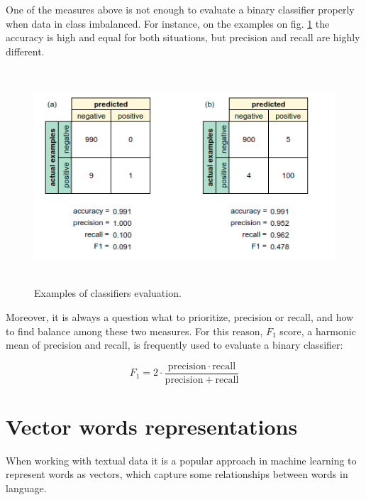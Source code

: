 One of the measures above is not enough to evaluate a binary classifier properly when data in class imbalanced. For instance, on the examples on fig. \ref{fig:classifiers-evaluation} the accuracy is high and equal for both situations, but precision and recall are highly different. 


\begin{figure}[h]
    \centering
    \includegraphics[height=8cm]{Images/Classifiers-evaluation.png}
    \caption{Examples of classifiers evaluation.}
    \label{fig:classifiers-evaluation}
\end{figure}

Moreover, it is always a question what to prioritize, precision or recall, and how to find balance among these two measures. For this reason, $F_1$ score, a harmonic mean of precision and recall, is frequently used to evaluate a binary classifier:

\begin{equation}
    F_{1}=2\cdot {\frac {\mathrm {precision} \cdot \mathrm {recall} }{\mathrm {precision} +\mathrm {recall} }}
\end{equation} 

\section{Vector words representations}

When working with textual data it is a popular approach in machine learning to represent words as vectors, which capture some relationships between words in language.

